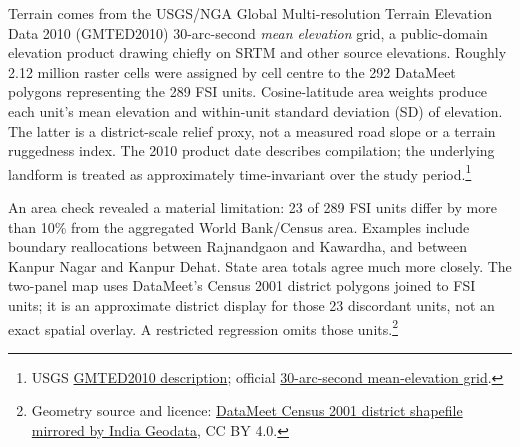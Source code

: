 \documentclass[11pt,a4paper]{article}
\begin{document}
Terrain comes from the USGS/NGA Global Multi-resolution Terrain Elevation Data 2010 (GMTED2010) 30-arc-second \emph{mean elevation} grid, a public-domain elevation product drawing chiefly on SRTM and other source elevations. Roughly 2.12 million raster cells were assigned by cell centre to the 292 DataMeet polygons representing the 289 FSI units. Cosine-latitude area weights produce each unit's mean elevation and within-unit standard deviation (SD) of elevation. The latter is a district-scale relief proxy, not a measured road slope or a terrain ruggedness index. The 2010 product date describes compilation; the underlying landform is treated as approximately time-invariant over the study period.\footnote{USGS \href{https://www.usgs.gov/centers/eros/science/usgs-eros-archive-digital-elevation-global-multi-resolution-terrain-elevation}{GMTED2010 description}; official \href{https://topotools.cr.usgs.gov/gmted_viewer/gmted2010_global_grids.php}{30-arc-second mean-elevation grid}.}

An area check revealed a material limitation: 23 of 289 FSI units differ by more than 10\% from the aggregated World Bank/Census area. Examples include boundary reallocations between Rajnandgaon and Kawardha, and between Kanpur Nagar and Kanpur Dehat. State area totals agree much more closely. The two-panel map uses DataMeet's Census 2001 district polygons joined to FSI units; it is an approximate district display for those 23 discordant units, not an exact spatial overlay. A restricted regression omits those units.\footnote{Geometry source and licence: \href{https://github.com/yashveeeeeeer/india-geodata/tree/main/data/administrative/districts/census-2001}{DataMeet Census 2001 district shapefile mirrored by India Geodata}, CC BY 4.0.}
\end{document}
